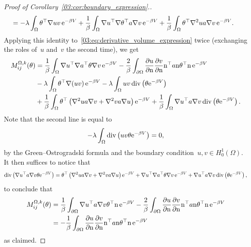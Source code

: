 \begin{proof}[Proof of Corollary~\ref{03:cor:boundary_expression}.]
\begin{equation}
\begin{aligned}
        &= -\lambda\int_\Omega \theta^\top \nabla u v\,\mathrm{e}^{-\beta V} + \frac1\beta\int_\Omega \nabla u^\top \nabla\theta^\top a \nabla v\,\mathrm{e}^{-\beta V}+\frac1\beta \int_\Omega \theta^\top \nabla^2 u a \nabla v\,\mathrm{e}^{-\beta V}.
        \end{aligned}
    \end{equation}
    Applying this identity to~\eqref{03:eq:derivative_volume_expression} twice (exchanging the roles of~$u$ and~$v$ the second time), we get
    \begin{equation}
        \begin{aligned}
            M_{ij}^{\Omega,k}(\theta) &= \frac1\beta\int_\Omega \nabla u^\top \nabla a^\top \theta\nabla v\,\mathrm{e}^{-\beta V}-\frac2\beta\int_{\partial\Omega}\frac{\partial u}{\partial \mathrm{n}}\frac{\partial v}{\partial\mathrm{n}}\mathrm{n}^\top a\mathrm{n} \theta^\top\mathrm{n}\,\mathrm{e}^{-\beta V}\\
            &-\lambda\int_{\Omega}\theta^\top \nabla(uv)\,\mathrm{e}^{-\beta V}-\lambda\int_{\Omega}uv\,\mathrm{div}\left(\theta\mathrm{e}^{-\beta V}\right)\\
            &+\frac1\beta\int_\Omega\theta^\top\left(\nabla^2 u a\nabla v + \nabla^2 v a \nabla u\right)\mathrm{e}^{-\beta V} + \frac1\beta\int_\Omega \nabla u^\top a \nabla v\,\mathrm{div}\left(\theta\mathrm{e}^{-\beta V}\right).
        \end{aligned}
    \end{equation}
    Note that the second line is equal to
    \[-\lambda\int_\Omega \mathrm{div}\left(uv \theta \mathrm{e}^{-\beta V}\right) = 0,\]
    by the Green--Ostrogradski formula and the boundary condition~$u,v\in H_0^1(\Omega)$.
    It then suffices to notice that
    \begin{equation}
        \mathrm{div}\left(\nabla u^\top a \nabla v \theta \mathrm{e}^{-\beta V}\right) = \theta^\top\left(\nabla^2 u a\nabla v + \nabla^2 v a \nabla u\right)\mathrm{e}^{-\beta V} + \nabla u^\top \nabla a^\top \theta \nabla v\,\mathrm{e}^{-\beta V} + \nabla u^\top a \nabla v\,\mathrm{div}\left(\theta\mathrm{e}^{-\beta V}\right),
    \end{equation}
    to conclude that
    \begin{equation}
        \begin{aligned}
            M_{ij}^{\Omega,k}(\theta) &= \frac1\beta \int_{\partial\Omega}\nabla u^\top a \nabla v \theta^\top \mathrm{n}\,\mathrm{e}^{-\beta V} - \frac2\beta \int_{\partial\Omega}\frac{\partial u}{\partial \mathrm{n}}\frac{\partial v}{\partial\mathrm{n}}\mathrm{n}^\top a\mathrm{n} \theta^\top\mathrm{n}\,\mathrm{e}^{-\beta V}\\
            &=-\frac1\beta\int_{\partial\Omega}\frac{\partial u}{\partial \mathrm{n}}\frac{\partial v}{\partial\mathrm{n}}\mathrm{n}^\top a\mathrm{n} \theta^\top\mathrm{n}\,\mathrm{e}^{-\beta V}
        \end{aligned}
    \end{equation}
    as claimed.
\end{proof}

